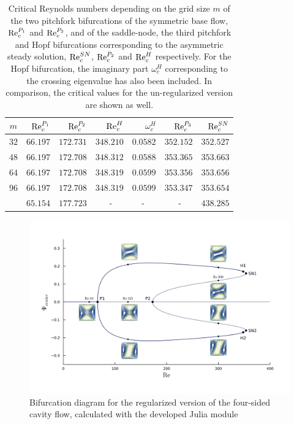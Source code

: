\begin{table}[h!]
  \centering
  \caption{Critical Reynolds numbers depending on the grid size $m$ of the two
    pitchfork bifurcations of the symmetric base flow, $\mathrm{Re}_c^{P_1}$ and
    $\mathrm{Re}_c^{P_2}$, and of the saddle-node, the third pitchfork and Hopf
    bifurcations corresponding to the asymmetric steady solution,
    $\mathrm{Re}_c^{SN}$, $\mathrm{Re}_c^{P_3}$ and $\mathrm{Re}_c^{H}$ respectively. For the Hopf
    bifurcation, the imaginary part $\omega_c^{H}$ corresponding to the crossing
    eigenvalue has also been included. In comparison, the critical values for the
    un-regularized version are shown as well.}
  \label{tab:re_crit}
\begin{tabular}{crrrrrr}
$m$ & $\mathrm{Re}_c^{P_1}$ & $\mathrm{Re}_c^{P_2}$ & $\mathrm{Re}_c^{H}$ &  $\omega_c^{H}$ & $\mathrm{Re}_c^{P_3}$ & $\mathrm{Re}_c^{SN}$  \\
\hline
$32$ & $66.197$ & $172.731$ & $348.210$ & $0.0582$ & $352.152$ & $352.527$ \\
$48$ & $66.197$ & $172.708$ & $348.312$ & $0.0588$ & $353.365$ & $353.663$ \\
$64$ & $66.197$ & $172.708$ & $348.319$ & $0.0599$ & $353.356$ & $353.656$ \\
$96$ & $66.197$ & $172.708$ & $348.319$ & $0.0599$ & $353.347$ & $353.654$ \\
\citet{chen2013} & $65.154$ & $177.723$ & - $\quad$ & - $\quad$ & - $\quad$ & $438.285$ \\
\end{tabular}
\end{table}

\begin{figure}[h!]
  \centering
  \includegraphics[width=\textwidth]{figs/bifurcation_diag64x64.png}
  \caption{Bifurcation diagram for the regularized version of the four-sided
    cavity flow, calculated with the developed Julia module} 
  \label{fig:bif_diag}
\end{figure}

